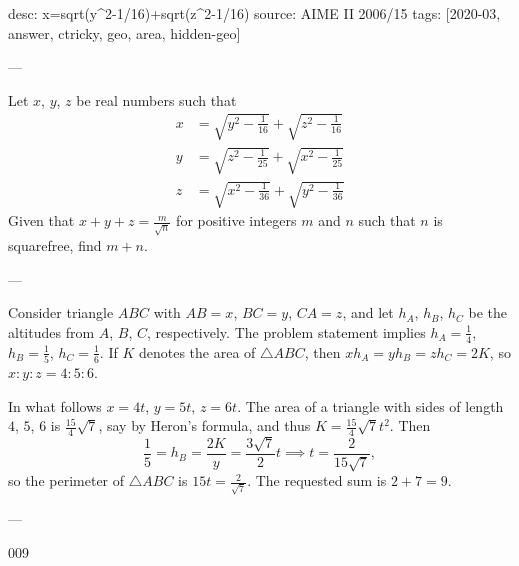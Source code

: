 desc: x=sqrt(y^2-1/16)+sqrt(z^2-1/16)
source: AIME II 2006/15
tags: [2020-03, answer, ctricky, geo, area, hidden-geo]

---

Let $x$, $y$, $z$ be real numbers such that 
\begin{align*}
    x&=\sqrt{y^2-\tfrac1{16}}+\sqrt{z^2-\tfrac1{16}}\\
    y&=\sqrt{z^2-\tfrac1{25}}+\sqrt{x^2-\tfrac1{25}}\\
    z&=\sqrt{x^2-\tfrac1{36}}+\sqrt{y^2-\tfrac1{36}}
\end{align*}
Given that $x+y+z=\tfrac m{\sqrt n}$ for positive integers $m$ and $n$ such that $n$ is squarefree, find $m+n$.

---

Consider triangle $ABC$ with $AB=x$, $BC=y$, $CA=z$, and let $h_A$, $h_B$, $h_C$ be the altitudes from $A$, $B$, $C$, respectively. The problem statement implies $h_A=\tfrac14$, $h_B=\tfrac15$, $h_C=\tfrac16$. If $K$ denotes the area of $\triangle ABC$, then $xh_A=yh_B=zh_C=2K$, so $x:y:z=4:5:6$.

In what follows $x=4t$, $y=5t$, $z=6t$. The area of a triangle with sides of length $4$, $5$, $6$ is $\tfrac{15}4\sqrt7$, say by Heron's formula, and thus $K=\tfrac{15}4\sqrt7t^2$. Then \[\frac15=h_B=\frac{2K}y=\frac{3\sqrt7}2t\implies t=\frac2{15\sqrt7},\]
so the perimeter of $\triangle ABC$ is $15t=\tfrac2{\sqrt7}$. The requested sum is $2+7=9$.

---

009
